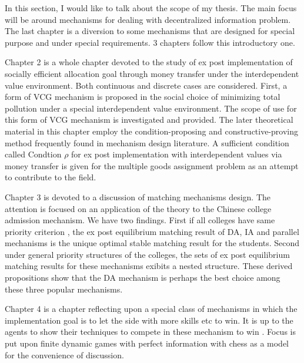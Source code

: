 In this section, I would like to talk about the scope of my
thesis. The main focus will be around mechanisms for dealing with
decentralized information problem. The last chapter is a diversion to
some mechanisms that are designed for special purpose and under special requirements. 3 chapters follow this introductory one.

Chapter 2 is a whole chapter devoted to the study of ex post implementation of socially efficient allocation goal through money transfer under the interdependent value environment. Both continuous and discrete cases are considered. First, a form of VCG mechanism is proposed in the social choice of minimizing total pollution under a special interdependent value environment. The scope of use for this form of VCG mechanism is investigated and provided.  The later theoretical material in this chapter employ the condition-proposing and constructive-proving method frequently found in mechanism design literature.  A sufficient condition called Condtion $\rho$ for ex post implementation with interdependent values via money transfer is given for the multiple goods assignment problem as an attempt to contribute to the field. 

Chapter 3 is devoted to a discussion of matching mechanisms design. The attention is focused on an application of the theory to the Chinese college admission mechanism. We have two findings. First if all colleges have same priority criterion , the ex post equilibrium matching result of DA, IA and parallel mechanisms is the unique optimal stable matching result for the students. Second under general priority structures of the colleges, the sets of ex post equilibrium matching results for these mechanisms exibits a nested structure. These derived propositions show that the DA mechanism is perhaps the best choice among these three popular mechanisms.

Chapter 4 is a chapter reflecting upon a special class of mechanisms in which the implementation goal is to let the side with more skills etc to win. It is up to the agents to show their techniques to compete in these mechanism to win . Focus is put upon finite dynamic games with perfect information with chess as a model for the convenience of discussion.





